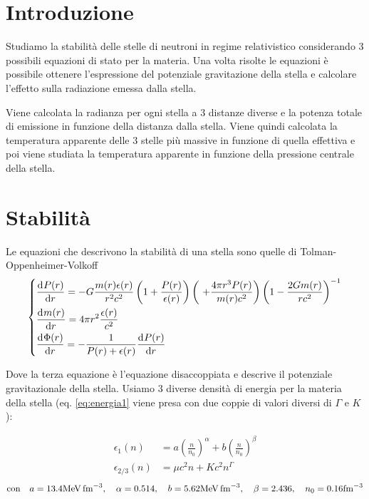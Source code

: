 \documentclass[a4paper, titlepage]{article}
\begin{document}
\section{Introduzione}
Studiamo la stabilità delle stelle di neutroni in regime relativistico considerando 3 possibili equazioni di stato per la materia.
Una volta risolte le equazioni è possibile ottenere l'espressione del potenziale gravitazione della stella e calcolare l'effetto sulla radiazione emessa dalla stella.


Viene calcolata la radianza per ogni stella a 3 distanze diverse e la potenza totale di emissione in funzione della distanza dalla stella.
Viene quindi calcolata la temperatura apparente delle 3 stelle più massive in funzione di quella effettiva e poi viene studiata la temperatura apparente in funzione della pressione centrale della stella.

\section{Stabilità}

Le equazioni che descrivono la stabilità di una stella sono quelle di Tolman-Oppenheimer-Volkoff
\begin{equation}
    \begin{dcases}
        \dv[]{P(r)}{r} = - G \frac{m(r) \epsilon (r)}{r^2 c^2} \left(1 + \frac{P(r)}{\epsilon (r)} \right) \left(\ + \frac{4 \pi r^3 P(r)}{m(r) c^2} \right) \left(1 - \frac{2 G m(r)}{r c^2} \right)^{-1} \\
        \dv[]{m(r)}{r} = 4 \pi r^2 \frac{\epsilon (r)}{c^2} \\
        \dv[]{\Phi(r)}{r} = - \frac{1}{P(r) + \epsilon (r)} \dv[]{P(r)}{r}
    \end{dcases}
    \label{eq:sistema_corr}
\end{equation}

Dove la terza equazione è l'equazione disaccoppiata e descrive il potenziale gravitazionale della stella.
Usiamo 3 diverse densità di energia per la materia della stella (eq. \ref{eq:energia1} viene presa con due coppie di valori diversi di $\Gamma$ e $K$):

\begin{align}
    \epsilon_1 (n) &= a \left( \frac{n}{n_0} \right) ^{\alpha} + b \left( \frac{n}{n_0} \right) ^{\beta} \\
    \epsilon_{2/3} (n) &= \mu c^2n+Kc^2n^\Gamma
    \label{eq:energia1}
\end{align}
\begin{equation}
    \text{con} \quad a = 13.4 \unit{\mega\electronvolt\per\femto\cubic\meter}, \quad
    \alpha = 0.514, \quad
    b = 5.62 \unit{\mega\electronvolt\per\femto\cubic\meter}, \quad
    \beta = 2.436, \quad
    n_0 = 0.16 \unit{\per\femto\cubic\meter} \\
\end{equation}
\end{document}
